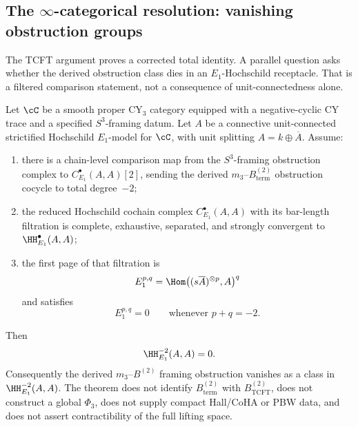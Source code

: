\subsection{The \texorpdfstring{$\infty$}{inf}-categorical resolution: vanishing
obstruction groups}
\label{subsec:infty-cat-resolution}

The TCFT argument proves a corrected total identity.  A parallel
question asks whether the derived obstruction class dies in an
$E_1$-Hochschild receptacle.  That is a filtered comparison
statement, not a consequence of unit-connectedness alone.

\begin{theorem}
\label{thm:derived-framing-m3b2}
Let $\cC$ be a smooth proper CY$_3$ category equipped with a
negative-cyclic CY trace and a specified $S^3$-framing datum.
Let $A$ be a connective unit-connected strictified Hochschild
$E_1$-model for $\cC$, with unit splitting
$A = k \oplus \overline{A}$.  Assume:
\begin{enumerate}[label=\textup{(\roman*)}]
 \item there is a chain-level comparison map from the
 $S^3$-framing obstruction complex to
 $C^\bullet_{E_1}(A,A)[2]$, sending the derived
 $m_3$--$B^{(2)}_{\mathrm{term}}$ obstruction cocycle to total
 degree~$-2$;
 \item the reduced Hochschild cochain complex
 $C^\bullet_{E_1}(A,A)$ with its bar-length filtration is
 complete, exhaustive, separated, and strongly convergent to
 $\HH^\bullet_{E_1}(A,A)$;
 \item the first page of that filtration is
 \[
        E_1^{p,q}
        =
        \Hom\bigl((s\overline{A})^{\otimes p},A\bigr)^q
 \]
 and satisfies
 \[
        E_1^{p,q}=0\qquad\text{whenever }p+q=-2 .
 \]
\end{enumerate}
Then
\[
        \HH^{-2}_{E_1}(A,A)=0 .
\]
Consequently the derived $m_3$--$B^{(2)}$ framing obstruction
vanishes as a class in $\HH^{-2}_{E_1}(A,A)$.  The theorem does
not identify $B^{(2)}_{\mathrm{term}}$ with
$B^{(2)}_{\mathrm{TCFT}}$, does not construct a global
$\Phi_3$, does not supply compact Hall/CoHA or PBW data, and
does not assert contractibility of the full lifting space.
\end{theorem}

